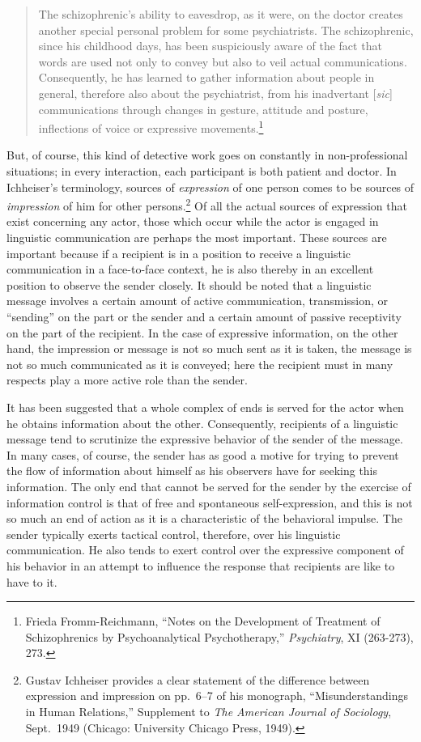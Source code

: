 \documentclass[openany,nobib]{tufte-book}
\begin{document}
\begin{quote}
The schizophrenic's ability to eavesdrop, as it were, on the doctor
creates another special personal problem for some psychiatrists. The
schizophrenic, since his childhood days, has been suspiciously aware of
the fact that words are used not only to convey but also to veil actual
communications. Consequently, he has learned to gather information about
people in general, therefore also about the psychiatrist, from his
inadvertant {[}\emph{sic}{]} communications through changes in ges­ture,
attitude and posture, inflections of voice or expres­sive
movements.\footnote{Frieda Fromm-Reichmann, ``Notes on the Development
  of Treatment of Schizophrenics by Psychoanalytical Psychotherapy,''
  \emph{Psychiatry}, XI (263-273), 273.}
\end{quote}

\noindent But, of course, this kind of detective work goes on constantly in
non-professional situations; in every interaction, each participant is
both patient and doctor. In Ichheiser's terminology, sources of
\emph{expression} of one person comes to be sources of \emph{impression}
of him for other persons.\footnote{Gustav Ichheiser provides a clear
  statement of the difference between expression and impression on
  pp.~6--7 of his mono­graph, ``Misunderstandings in Human Relations,''
  Supplement to \emph{The American Journal of Sociology}, Sept.~1949
  (Chicago: University Chicago Press, 1949).} Of all the actu­al sources
of expression that exist concerning any actor, those which occur while
the actor is engaged in linguistic communication are perhaps the most
important. These sources are important because if a recipient is in a
position to receive a linguistic communication in a face-to-face
context, he is also thereby in an excellent position to observe the
sender closely. It should be noted that a linguistic message involves a
certain amount of ac­tive communication, transmission, or ``sending'' on
the part or the sender and a certain amount of passive receptivity on
the part of the recipient. In the case of expressive information, on the
other hand, the impression or message is not so much sent as it is
taken, the message is not so much communicated as it is conveyed; here
the recipient must in many respects play a more active role than the
sender.

It has been suggested that a whole complex of ends is served for the
actor when he obtains information about the other. Consequently,
recipients of a linguistic message tend to scruti­nize the expressive
behavior of the sender of the message. In many cases, of course, the
sender has as good a motive for try­ing to prevent the flow of
information about himself as his ob­servers have for seeking this
information. The only end that cannot be served for the sender by the
exercise of information control is that of free and spontaneous
self-expression, and this is not so much an end of action as it is a
characteristic of the behavioral impulse. The sender typically exerts
tactical con­trol, therefore, over his linguistic communication. He also
tends to exert control over the expressive component of his be­havior in
an attempt to influence the response that recipients are like to have to
it.
\end{document}
